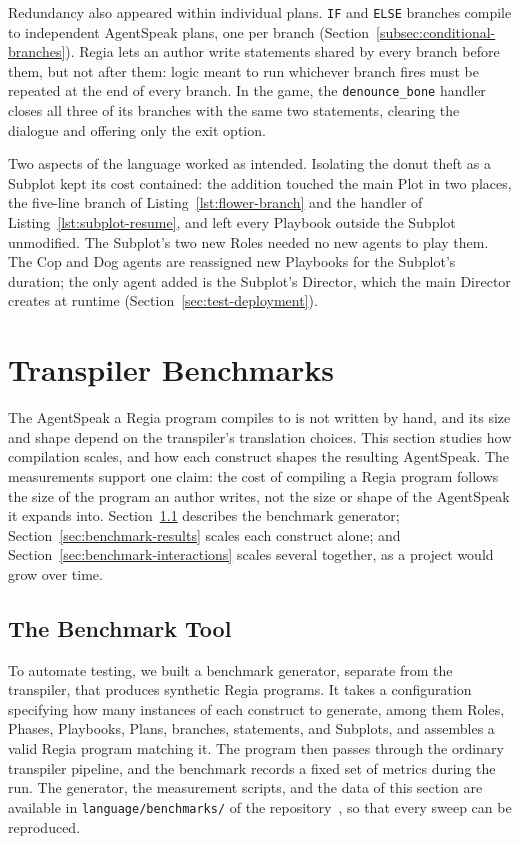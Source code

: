 Redundancy also appeared within individual plans. \lstinline|IF| and \lstinline|ELSE| branches compile to independent AgentSpeak plans, one per branch (Section~\ref{subsec:conditional-branches}). Regia lets an author write statements shared by every branch before them, but not after them: logic meant to run whichever branch fires must be repeated at the end of every branch. In the game, the \lstinline|denounce_bone| handler closes all three of its branches with the same two statements, clearing the dialogue and offering only the exit option.

Two aspects of the language worked as intended. Isolating the donut theft as a Subplot kept its cost contained: the addition touched the main Plot in two places, the five-line branch of Listing~\ref{lst:flower-branch} and the handler of Listing~\ref{lst:subplot-resume}, and left every Playbook outside the Subplot unmodified. The Subplot's two new Roles needed no new agents to play them. The Cop and Dog agents are reassigned new Playbooks for the Subplot's duration; the only agent added is the Subplot's Director, which the main Director creates at runtime (Section~\ref{sec:test-deployment}).

\section{Transpiler Benchmarks}
\label{sec:benchmarks}
 
The AgentSpeak a Regia program compiles to is not written by hand, and its size and shape depend on the transpiler's translation choices. This section studies how compilation scales, and how each construct shapes the resulting AgentSpeak. The measurements support one claim: the cost of compiling a Regia program follows the size of the program an author writes, not the size or shape of the AgentSpeak it expands into. Section~\ref{sec:benchmark-tool} describes the benchmark generator; Section~\ref{sec:benchmark-results} scales each construct alone; and Section~\ref{sec:benchmark-interactions} scales several together, as a project would grow over time.

\subsection{The Benchmark Tool}
\label{sec:benchmark-tool}

To automate testing, we built a benchmark generator, separate from the transpiler, that produces synthetic Regia programs. It takes a configuration specifying how many instances of each construct to generate, among them Roles, Phases, Playbooks, Plans, branches, statements, and Subplots, and assembles a valid Regia program matching it. The program then passes through the ordinary transpiler pipeline, and the benchmark records a fixed set of metrics during the run. The generator, the measurement scripts, and the data of this section are available in \lstinline|language/benchmarks/| of the repository~\cite{RegiaRepo}, so that every sweep can be reproduced.

